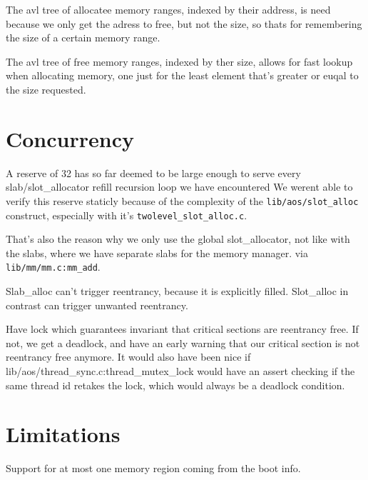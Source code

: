 The avl tree of allocatee memory ranges, indexed by their address, is need
because we only get the adress to free, but not the size, so thats for
remembering the size of a certain memory range.

The avl tree of free memory ranges, indexed by ther size, allows for fast
lookup when allocating memory, one just for the least element that's greater or
euqal to the size requested.

\section{Concurrency}\label{mem-con}

A reserve of 32 has so far deemed to be large enough to serve every
slab/slot\_allocator refill recursion loop we have encountered
We werent able to verify this reserve staticly because of the complexity of the
\verb|lib/aos/slot_alloc| construct, especially with it's
\verb|twolevel_slot_alloc.c|.

That's also the reason why we only use the global slot\_allocator, not like with
the slabs, where we have separate slabs for the memory manager.
via \verb|lib/mm/mm.c:mm_add|.

Slab\_alloc can't trigger reentrancy, because it is explicitly filled. Slot\_alloc
in contrast can trigger unwanted reentrancy.

Have lock which guarantees invariant that critical sections are reentrancy free.
If not, we get a deadlock, and have an early warning that our critical section
is not reentrancy free anymore.
It would also have been nice if lib/aos/thread\_sync.c:thread\_mutex\_lock would
have an assert checking if the same thread id retakes the lock, which would
always be a deadlock condition.

\section{Limitations}

Support for at most one memory region coming from the boot info.
